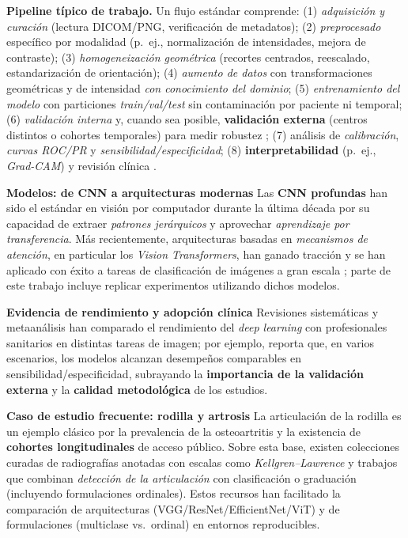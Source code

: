 \documentclass[11pt,spanish,listoffigures,listoftables]{tfgetsinf}
\begin{document}
\medskip
\noindent\textbf{Pipeline típico de trabajo.} Un flujo estándar comprende: (1) \emph{adquisición y curación} (lectura DICOM/PNG, verificación de metadatos); (2) \emph{preprocesado} específico por modalidad (p.~ej., normalización de intensidades, mejora de contraste); (3) \emph{homogeneización geométrica} (recortes centrados, reescalado, estandarización de orientación); (4) \emph{aumento de datos} con transformaciones geométricas y de intensidad \emph{con conocimiento del dominio}; (5) \emph{entrenamiento del modelo} con particiones \emph{train/val/test} sin contaminación por paciente ni temporal; (6) \emph{validación interna} y, cuando sea posible, \textbf{validación externa} (centros distintos o cohortes temporales) para medir robustez \cite{liu_meta_analysis}; (7) análisis de \emph{calibración}, \emph{curvas ROC/PR} y \emph{sensibilidad/especificidad}; (8) \textbf{interpretabilidad} (p.~ej., \emph{Grad-CAM}) y revisión clínica \cite{selvaraju2017grad}.

\medskip
\noindent\textbf{Modelos: de CNN a arquitecturas modernas} Las \textbf{CNN profundas} han sido el estándar en visión por computador durante la última década por su capacidad de extraer \emph{patrones jerárquicos} y aprovechar \emph{aprendizaje por transferencia}. Más recientemente, arquitecturas basadas en \emph{mecanismos de atención}, en particular los \emph{Vision Transformers}, han ganado tracción y se han aplicado con éxito a tareas de clasificación de imágenes a gran escala \cite{dosovitskiy2021an}; parte de este trabajo incluye replicar experimentos utilizando dichos modelos.

\medskip
\noindent\textbf{Evidencia de rendimiento y adopción clínica} Revisiones sistemáticas y metaanálisis han comparado el rendimiento del \emph{deep learning} con profesionales sanitarios en distintas tareas de imagen; por ejemplo, \cite{liu_meta_analysis} reporta que, en varios escenarios, los modelos alcanzan desempeños comparables en sensibilidad/especificidad, subrayando la \textbf{importancia de la validación externa} y la \textbf{calidad metodológica} de los estudios.

\medskip
\noindent\textbf{Caso de estudio frecuente: rodilla y artrosis} La articulación de la rodilla es un ejemplo clásico por la prevalencia de la osteoartritis y la existencia de \textbf{cohortes longitudinales} de acceso público. Sobre esta base, existen colecciones curadas de radiografías anotadas con escalas como \emph{Kellgren--Lawrence} y trabajos que combinan \emph{detección de la articulación} con clasificación o graduación (incluyendo formulaciones ordinales). Estos recursos han facilitado la comparación de arquitecturas (VGG/ResNet/EfficientNet/ViT) y de formulaciones (multiclase vs.\ ordinal) en entornos reproducibles.
\end{document}
